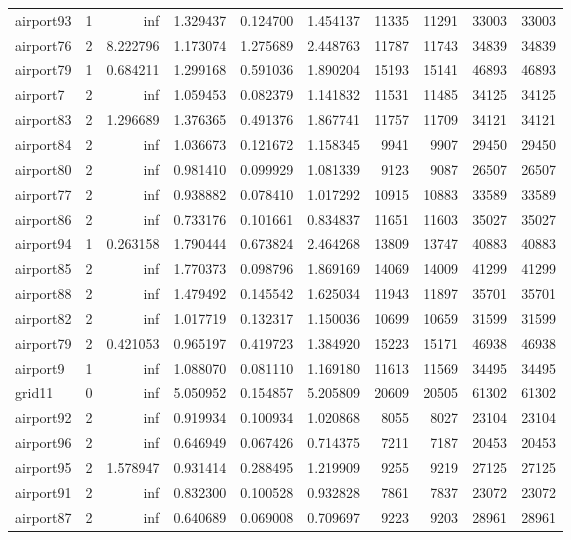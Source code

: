 \begin{longtable}{|l|r|r|r|r|r|r|r|r|r|}
airport93 & 1 & inf & 1.329437 & 0.124700 & 1.454137 & 11335 & 11291 & 33003 & 33003 \\
airport76 & 2 & 8.222796 & 1.173074 & 1.275689 & 2.448763 & 11787 & 11743 & 34839 & 34839 \\
airport79 & 1 & 0.684211 & 1.299168 & 0.591036 & 1.890204 & 15193 & 15141 & 46893 & 46893 \\
airport7 & 2 & inf & 1.059453 & 0.082379 & 1.141832 & 11531 & 11485 & 34125 & 34125 \\
airport83 & 2 & 1.296689 & 1.376365 & 0.491376 & 1.867741 & 11757 & 11709 & 34121 & 34121 \\
airport84 & 2 & inf & 1.036673 & 0.121672 & 1.158345 & 9941 & 9907 & 29450 & 29450 \\
airport80 & 2 & inf & 0.981410 & 0.099929 & 1.081339 & 9123 & 9087 & 26507 & 26507 \\
airport77 & 2 & inf & 0.938882 & 0.078410 & 1.017292 & 10915 & 10883 & 33589 & 33589 \\
airport86 & 2 & inf & 0.733176 & 0.101661 & 0.834837 & 11651 & 11603 & 35027 & 35027 \\
airport94 & 1 & 0.263158 & 1.790444 & 0.673824 & 2.464268 & 13809 & 13747 & 40883 & 40883 \\
airport85 & 2 & inf & 1.770373 & 0.098796 & 1.869169 & 14069 & 14009 & 41299 & 41299 \\
airport88 & 2 & inf & 1.479492 & 0.145542 & 1.625034 & 11943 & 11897 & 35701 & 35701 \\
airport82 & 2 & inf & 1.017719 & 0.132317 & 1.150036 & 10699 & 10659 & 31599 & 31599 \\
airport79 & 2 & 0.421053 & 0.965197 & 0.419723 & 1.384920 & 15223 & 15171 & 46938 & 46938 \\
airport9 & 1 & inf & 1.088070 & 0.081110 & 1.169180 & 11613 & 11569 & 34495 & 34495 \\
grid11 & 0 & inf & 5.050952 & 0.154857 & 5.205809 & 20609 & 20505 & 61302 & 61302 \\
airport92 & 2 & inf & 0.919934 & 0.100934 & 1.020868 & 8055 & 8027 & 23104 & 23104 \\
airport96 & 2 & inf & 0.646949 & 0.067426 & 0.714375 & 7211 & 7187 & 20453 & 20453 \\
airport95 & 2 & 1.578947 & 0.931414 & 0.288495 & 1.219909 & 9255 & 9219 & 27125 & 27125 \\
airport91 & 2 & inf & 0.832300 & 0.100528 & 0.932828 & 7861 & 7837 & 23072 & 23072 \\
airport87 & 2 & inf & 0.640689 & 0.069008 & 0.709697 & 9223 & 9203 & 28961 & 28961 \\

\end{longtable}

